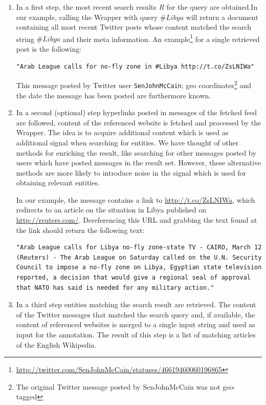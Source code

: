 \documentclass{llncs}
\begin{document}
\begin{enumerate}
	\item In a first step, the most recent search results $R$ for the query are
	obtained.\newline In our example, calling the Wrapper with query $\#Libya$ will
	return a document containing all most recent Twitter posts whose content
	matched the search string $\#Libya$ and their meta information. 
	\newline
	An example\footnote{\url{http://twitter.com/SenJohnMcCain/statuses/46619460060196865}}
for a single retrieved post is the following:
{\small
\begin{verbatim}
"Arab League calls for no-fly zone in #Libya http://t.co/ZsLNIWa"
\end{verbatim}}
This message posted by Twitter user \texttt{SenJohnMcCain}; geo coordinates\footnote{The original Twitter message posted by SenJohnMcCain was not geo-tagged} and the date the message has been posted are furthermore known.
  
  \item In a second (optional) step hyperlinks posted in messages of the fetched
  feed are followed, content of the referenced website is fetched and processed by the Wrapper. The idea is to acquire additional content which is used as additional signal when searching for entities. We have thought of other methods for enriching the result, like searching for other messages posted by users which have posted messages in the result set. However, these alternative methods are more likely to introduce noise in the signal which is used for obtaining relevant entities.
  
In our example, the message contains a link to
\url{http://t.co/ZsLNIWa}, which redirects to an article on the situation in
Libya published on \url{http://reuters.com/}. Dereferencing this URL and grabbing
the text found at the link should return the following text:
{\small\begin{verbatim}"Arab League calls for Libya no-fly zone-state TV - CAIRO, March 12
(Reuters) - The Arab League on Saturday called on the U.N. Security 
Council to impose a no-fly zone on Libya, Egyptian state television
reported, a decision that would give a regional seal of approval
that NATO has said is needed for any military action."\end{verbatim}}
	\item In a third step entities matching the search result are retrieved. The
	content of the Twitter messages that matched the search query and, if available, the content of referenced websites is merged to a single input string and used as input for the annotation. The result of this step is a list of matching articles of the English Wikipedia.


\end{enumerate}
\end{document}

